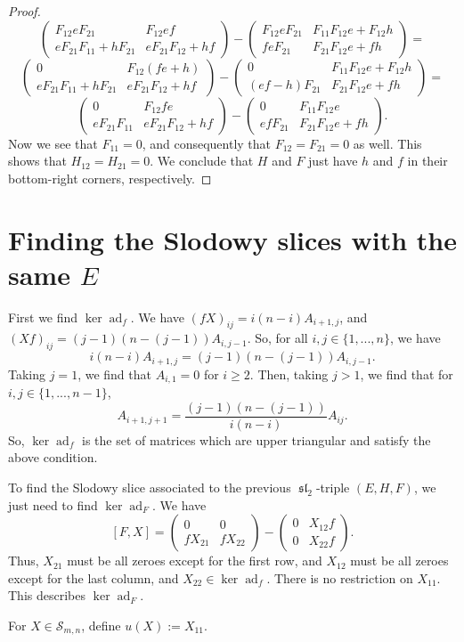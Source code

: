 \documentclass[12pt,psamsfonts]{article}
\DeclareMathOperator{\spl}{\mathfrak{sl}}
\DeclareMathOperator{\ad}{ad}
\begin{document}
\begin{proof}
\[\begin{pmatrix}
    F_{12} e F_{21} & F_{12}e f \\
    eF_{21} F_{11} + h F_{21} & eF_{21} F_{12} + hf
\end{pmatrix} - \begin{pmatrix}
    F_{12} e F_{21} & F_{11} F_{12}e + F_{12} h \\
    f eF_{21} & F_{21} F_{12}e + fh
\end{pmatrix} =\]
\[\begin{pmatrix}
    0 & F_{12}(fe + h) \\
    eF_{21} F_{11} + h F_{21} & eF_{21} F_{12} + hf
\end{pmatrix} - \begin{pmatrix}
    0 & F_{11} F_{12}e + F_{12} h \\
    (ef - h)F_{21} & F_{21} F_{12}e + fh
\end{pmatrix} =\]
\[\begin{pmatrix}
    0 & F_{12}fe \\
    eF_{21} F_{11} & eF_{21} F_{12} + hf
\end{pmatrix} - \begin{pmatrix}
    0 & F_{11} F_{12}e \\
    ef F_{21} & F_{21} F_{12}e + fh
\end{pmatrix}.\]
Now we see that \(F_{11} = 0\), and consequently that \(F_{12} = F_{21} = 0\) as well.
This shows that \(H_{12} = H_{21} = 0\).
We conclude that \(H\) and \(F\) just have \(h\) and \(f\) in their bottom-right corners, respectively.
\end{proof}

\section{Finding the Slodowy slices with the same \(E\)}
First we find \(\ker \ad_f\).
We have \((fX)_{ij} = i (n - i) A_{i + 1,j}\), and \((Xf)_{ij} = (j - 1) (n - (j - 1)) A_{i, j - 1}\).
So, for all \(i, j \in \{1, ..., n\}\), we have 
\[i(n - i)A_{i + 1,j} = (j - 1)(n - (j - 1))A_{i, j - 1}.\]
Taking \(j = 1\), we find that \(A_{i,1} = 0\) for \(i \geq 2\).
Then, taking \(j > 1\), we find that for \(i, j \in \{1, ..., n - 1\}\),
\[A_{i + 1, j + 1} = \frac{(j - 1)(n - (j - 1))}{i(n - i)} A_{ij}.\]
So, \(\ker\ad_f\) is the set of matrices which are upper triangular and satisfy the above condition.
\par To find the Slodowy slice associated to the previous \(\spl_2\)-triple \((E, H, F)\), we just need to find \(\ker\ad_F\).
We have 
\[[F, X] = \begin{pmatrix}
    0 & 0 \\
    f X_{21} & fX_{22}
\end{pmatrix} - \begin{pmatrix}
    0 & X_{12} f\\
    0 & X_{22} f
\end{pmatrix}.\]
Thus, \(X_{21}\) must be all zeroes except for the first row, and \(X_{12}\) must be all zeroes except for the last column, and \(X_{22} \in \ker\ad_f\).
There is no restriction on \(X_{11}\).
This describes \(\ker\ad_F\).
\par For \(X \in \mathcal{S}_{m,n}\), define \(u(X) := X_{11}\).
\end{document}
